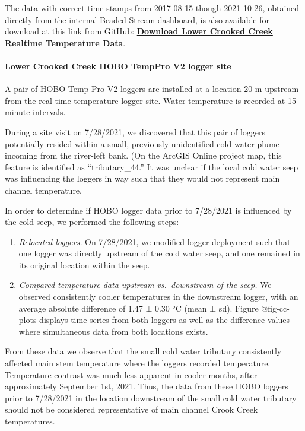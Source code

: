 \documentclass[
  letterpaper,
  DIV=11,
  numbers=noendperiod]{scrreprt}
\let\oldparagraph\paragraph
\renewcommand{\paragraph}[1]{\oldparagraph{#1}\mbox{}}
\begin{document}
The data with correct time stamps from 2017-08-15 though 2021-10-26,
obtained directly from the internal Beaded Stream dashboard, is also
available for download at this link from GitHub:
\href{https://github.com/Kenai-Watershed-Forum/kenai_thermal_imagery/tree/master/input/real_time_temp_sensor}{\textbf{Download
Lower Crooked Creek Realtime Temperature Data}}.

\hypertarget{lower-crooked-creek-hobo-temppro-v2-logger-site}{%
\paragraph{Lower Crooked Creek HOBO TempPro V2 logger
site}\label{lower-crooked-creek-hobo-temppro-v2-logger-site}}

A pair of HOBO Temp Pro V2 loggers are installed at a location 20 m
upstream from the real-time temperature logger site. Water temperature
is recorded at 15 minute intervals.

During a site visit on 7/28/2021, we discovered that this pair of
loggers potentially resided within a small, previously unidentified cold
water plume incoming from the river-left bank. (On the ArcGIS Online
project map, this feature is identified as ``tributary\_44.'' It was
unclear if the local cold water seep was influencing the loggers in way
such that they would not represent main channel temperature.

In order to determine if HOBO logger data prior to 7/28/2021 is
influenced by the cold seep, we performed the following steps:

\begin{enumerate}
\def\labelenumi{\arabic{enumi}.}
\item
  \emph{Relocated loggers.} On 7/28/2021, we modified logger deployment
  such that one logger was directly upstream of the cold water seep, and
  one remained in its original location within the seep.
\item
  \emph{Compared temperature data upstream vs.~downstream of the seep.}
  We observed consistently cooler temperatures in the downstream logger,
  with an average absolute difference of 1.47 ± 0.30 °C (mean ± sd).
  Figure @fig-cc-plots displays time series from both loggers as well as
  the difference values where simultaneous data from both locations
  exists.
\end{enumerate}

From these data we observe that the small cold water tributary
consistently affected main stem temperature where the loggers recorded
temperature. Temperature contrast was much less apparent in cooler
months, after approximately September 1st, 2021. Thus, the data from
these HOBO loggers prior to 7/28/2021 in the location downstream of the
small cold water tributary should not be considered representative of
main channel Crook Creek temperatures.
\end{document}

